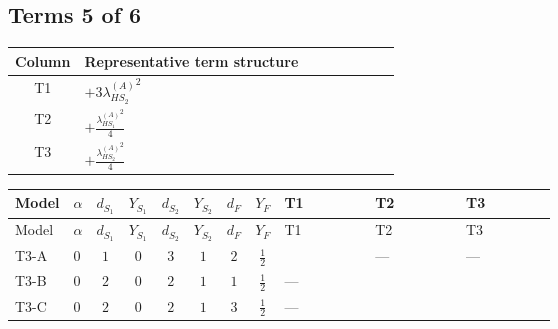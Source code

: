 \documentclass[8pt]{article}
\begin{document}
\begin{landscape}
\subsection*{Terms 5 of 6}
\begin{center}
\begin{tabular}{@{}c >{\raggedright\arraybackslash}p{0.82\linewidth}@{}}
\toprule
Column & Representative term structure \\
\midrule
T1 & \(\displaystyle +3 {\lambda_{HS_2}^{(A)}}^2\) \\
\midrule
T2 & \(\displaystyle +\frac{{\lambda_{HS_1}^{(A)}}^2}{4}\) \\
\midrule
T3 & \(\displaystyle +\frac{{\lambda_{HS_2}^{(A)}}^2}{4}\) \\
\midrule
\bottomrule
\end{tabular}
\end{center}
\smallskip
\tiny
\begin{longtable}{@{}llcccccc >{\raggedright\arraybackslash}p{0.21\linewidth} >{\raggedright\arraybackslash}p{0.21\linewidth} >{\raggedright\arraybackslash}p{0.21\linewidth}@{}}
\toprule
Model & $\alpha$ & $d_{S_1}$ & $Y_{S_1}$ & $d_{S_2}$ & $Y_{S_2}$ & $d_F$ & $Y_F$ & T1 & T2 & T3 \\
\midrule
\endfirsthead
\toprule
Model & $\alpha$ & $d_{S_1}$ & $Y_{S_1}$ & $d_{S_2}$ & $Y_{S_2}$ & $d_F$ & $Y_F$ & T1 & T2 & T3 \\
\midrule
\endhead
T3-A & $0$ & $1$ & $0$ & $3$ & $1$ & $2$ & $\frac{1}{2}$ & \scriptsize\adjustbox{max width=\linewidth}{$\begin{gathered} +3 {\lambda_{HS_2}^{(A)}}^2\end{gathered}$} & --- & --- \\
\midrule
T3-B & $0$ & $2$ & $0$ & $2$ & $1$ & $1$ & $\frac{1}{2}$ & --- & \scriptsize\adjustbox{max width=\linewidth}{$\begin{gathered} +\frac{{\lambda_{HS_1}^{(A)}}^2}{4}\end{gathered}$} & \scriptsize\adjustbox{max width=\linewidth}{$\begin{gathered} +\frac{{\lambda_{HS_2}^{(A)}}^2}{4}\end{gathered}$} \\
\midrule
T3-C & $0$ & $2$ & $0$ & $2$ & $1$ & $3$ & $\frac{1}{2}$ & --- & \scriptsize\adjustbox{max width=\linewidth}{$\begin{gathered} +\frac{{\lambda_{HS_1}^{(A)}}^2}{4}\end{gathered}$} & \scriptsize\adjustbox{max width=\linewidth}{$\begin{gathered} +\frac{{\lambda_{HS_2}^{(A)}}^2}{4}\end{gathered}$} \\

\end{longtable}
\end{landscape}
\end{document}
